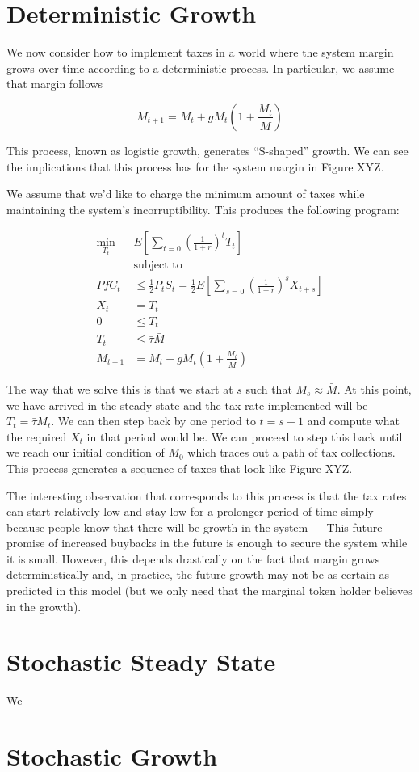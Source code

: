 \documentclass[12pt]{article}
\begin{document}
\section{Deterministic Growth} \label{sec:dg}

  We now consider how to implement taxes in a world where the system margin grows over time
  according to a deterministic process. In particular, we assume that margin follows

  $$M_{t+1} = M_{t} + g M_{t} \left(1 + \frac{M_{t}}{\bar{M}} \right)$$

  This process, known as logistic growth, generates ``S-shaped'' growth. We can see the implications
  that this process has for the system margin in Figure XYZ.

  We assume that we'd like to charge the minimum amount of taxes while maintaining the system's
  incorruptibility. This produces the following program:

  \begin{align*}
    \min_{T_t} &E \left[ \sum_{t=0} \left(\frac{1}{1 + r} \right)^t T_t \right] \\
    &\text{subject to} \\
    PfC_t &\leq \frac{1}{2} P_t S_t = \frac{1}{2} E \left[ \sum_{s=0} \left(\frac{1}{1 + r}\right)^s  X_{t + s} \right] \\
    X_{t} &= T_t \\
    0 &\leq T_t \\
    T_t &\leq \bar{\tau} \bar{M} \\
    M_{t+1} &= M_{t} + g M_{t} \left(1 + \frac{M_t}{\bar{M}} \right)
  \end{align*}

  The way that we solve this is that we start at $s$ such that $M_s \approx \bar{M}$. At this
  point, we have arrived in the steady state and the tax rate implemented will be
  $T_t = \bar{\tau} M_t$. We can then step back by one period to $t = s - 1$ and compute what the
  required $X_t$ in that period would be. We can proceed to step this back until we reach our
  initial condition of $M_0$ which traces out a path of tax collections. This process generates
  a sequence of taxes that look like Figure XYZ.

  The interesting observation that corresponds to this process is that the tax rates can start
  relatively low and stay low for a prolonger period of time simply because people know that there
  will be growth in the system --- This future promise of increased buybacks in the future is
  enough to secure the system while it is small. However, this depends drastically on the fact that
  margin grows deterministically and, in practice, the future growth may not be as certain as
  predicted in this model (but we only need that the marginal token holder believes in the growth).


\section{Stochastic Steady State} \label{sec:sss}

  We


\section{Stochastic Growth} \label{sec:sg}
\end{document}
